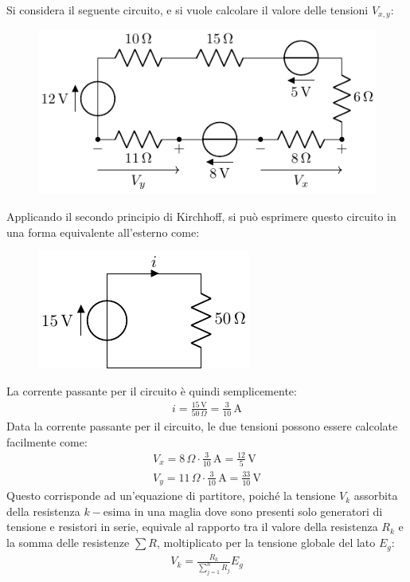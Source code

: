 \documentclass{article}
\newcommand{\SI}[1]{\mathrm{#1}}
\numberwithin{equation}{subsection}
\begin{document}
Si considera il seguente circuito, e si vuole calcolare il valore delle tensioni $V_{x,y}$:
\begin{figure}[H]%
    \centering
    \includegraphics{circuito-5.pdf}%
    \label{fig:circuito-5}
\end{figure}
Applicando il secondo principio di Kirchhoff, si può esprimere questo circuito in una forma equivalente all'esterno come:
\begin{figure}[H]%
    \centering
    \includegraphics{partitore-tensione.pdf}%
    \label{fig:partitore-tensione}
\end{figure}
La corrente passante per il circuito è quindi semplicemente:
\begin{gather*}
    i=\displaystyle\frac{15\,\SI{V}}{50\,\Omega}=\frac{3}{10}\,\SI{A}
\end{gather*}
Data la corrente passante per il circuito, le due tensioni possono essere calcolate facilmente come:
\begin{gather*}
    V_x=8\,\Omega\cdot \displaystyle\frac{3}{10}\,\SI{A}=\frac{12}{5}\,\SI{V}\\
    V_y=11\,\Omega\cdot \displaystyle\frac{3}{10}\,\SI{A}=\frac{33}{10}\,\SI{V}
\end{gather*}
Questo corrisponde ad un'equazione di partitore, poiché la tensione $V_k$ assorbita della resistenza $k-$esima in una maglia dove sono presenti solo generatori di tensione 
e resistori in serie, equivale al rapporto tra il valore della resistenza $R_k$ e la somma delle resistenze $\sum R$, moltiplicato per la tensione globale del lato $E_g$:
\begin{gather}
    V_k=\displaystyle\frac{R_k}{\sum_{j=1}^n R_j}E_g
\end{gather}
\end{document}

